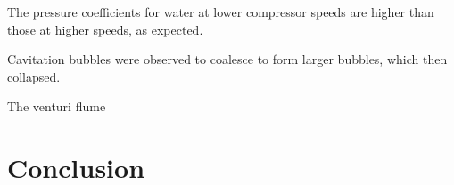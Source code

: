 \documentclass{article}
\begin{document}
The pressure coefficients for water at lower compressor speeds are higher than those at higher speeds, as expected.




Cavitation bubbles were observed to coalesce to form larger bubbles, which then collapsed.



The venturi flume 

\section{Conclusion}
\end{document}
